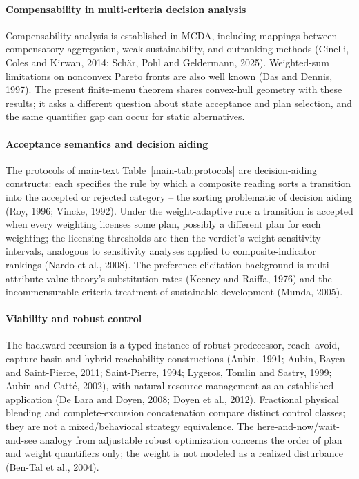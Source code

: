 \paragraph{Compensability in multi-criteria decision analysis} Compensability analysis is established in MCDA, including mappings between compensatory aggregation, weak sustainability, and outranking methods (Cinelli, Coles and Kirwan, 2014; Sch\"ar, Pohl and Geldermann, 2025). Weighted-sum limitations on nonconvex Pareto fronts are also well known (Das and Dennis, 1997). The present finite-menu theorem shares convex-hull geometry with these results; it asks a different question about state acceptance and plan selection, and the same quantifier gap can occur for static alternatives.

\paragraph{Acceptance semantics and decision aiding} The protocols of main-text Table~\ref{main-tab:protocols} are decision-aiding constructs: each specifies the rule by which a composite reading sorts a transition into the accepted or rejected category -- the sorting problematic of decision aiding (Roy, 1996; Vincke, 1992). Under the weight-adaptive rule a transition is accepted when every weighting licenses some plan, possibly a different plan for each weighting; the licensing thresholds are then the verdict's weight-sensitivity intervals, analogous to sensitivity analyses applied to composite-indicator rankings (Nardo et al., 2008). The preference-elicitation background is multi-attribute value theory's substitution rates (Keeney and Raiffa, 1976) and the incommensurable-criteria treatment of sustainable development (Munda, 2005).

\paragraph{Viability and robust control} The backward recursion is a typed instance of robust-predecessor, reach--avoid, capture-basin and hybrid-reachability constructions (Aubin, 1991; Aubin, Bayen and Saint-Pierre, 2011; Saint-Pierre, 1994; Lygeros, Tomlin and Sastry, 1999; Aubin and Catt\'e, 2002), with natural-resource management as an established application (De Lara and Doyen, 2008; Doyen et al., 2012). Fractional physical blending and complete-excursion concatenation compare distinct control classes; they are not a mixed/behavioral strategy equivalence. The here-and-now/wait-and-see analogy from adjustable robust optimization concerns the order of plan and weight quantifiers only; the weight is not modeled as a realized disturbance (Ben-Tal et al., 2004).

